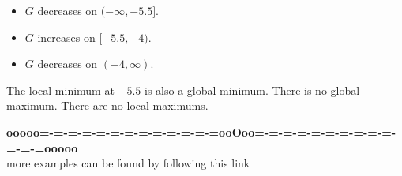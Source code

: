 \documentclass{ximera}
\begin{document}
\begin{example}
\begin{explanation}
\begin{itemize}
\item $G$ decreases on $(-\infty, -5.5]$.
\item $G$ increases on $[-5.5, -4)$.
\item $G$ decreases on $(-4, \infty)$.
\end{itemize}



The local minimum at $-5.5$ is also a global minimum.  There is no global maximum.  There are no local maximums.


\end{explanation}

\end{example}

























\begin{center}
\textbf{\textcolor{green!50!black}{ooooo=-=-=-=-=-=-=-=-=-=-=-=-=ooOoo=-=-=-=-=-=-=-=-=-=-=-=-=ooooo}} \\

more examples can be found by following this link\\ 

\end{center}
\end{document}
